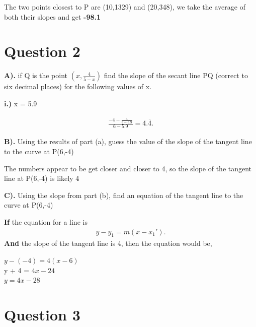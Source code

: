 \documentclass{report}
\begin{document}
    The two points closest to P are (10,1329) and (20,348), we take the average of both 
    their slopes and get \textbf{-98.1}
    
    \pagebreak
    \section{\Large{Question 2}}

    \bigbreak \noindent \bigbreak \noindent 

    \bigbreak \noindent 
    \textbf{A).} if Q is the point $ \left(x, \frac{4}{5-x}\right) $ 
    find the slope of the secant line PQ (correct to six decimal places) 
    for the following values of x.

    \bigbreak \noindent 
    \textbf{i.)} x = 5.9

    \begin{large}
        \begin{align*}
            \frac{-4- \frac{4}{5-5.9}}{6-5.9}
            =4.\overline{4}
        .\end{align*}
    \end{large}
    
    \bigbreak \noindent 
    \textbf{B).} Using the results of part (a), guess the value of the slope of the tangent 
    line to the curve at P(6,-4) 
    
    \bigbreak \noindent 
        The numbers appear to be get closer and closer to 4, so the slope of the tangent line
        at P(6,-4) is likely 4

    \bigbreak \noindent \bigbreak \noindent 
    \textbf{C).} Using the slope from part (b), find an equation of the tangent line 
    to the curve at P(6,-4)

    \bigbreak \noindent 
    \textbf{If} the equation for a line is
    \begin{align*}
        y-y_1=m \left(x-x_1'\right)
    .\end{align*}
    \textbf{And} the slope of the tangent line is 4, then the equation would be,
    \begin{center}
        $y- \left(-4\right) = 4 \left(x-6\right)$ \\
        y + 4 = $4x-24$ \\ 
        $y=4x-28$
    \end{center}
    
    \pagebreak
    \section{\Large{Question 3}}
\end{document}
